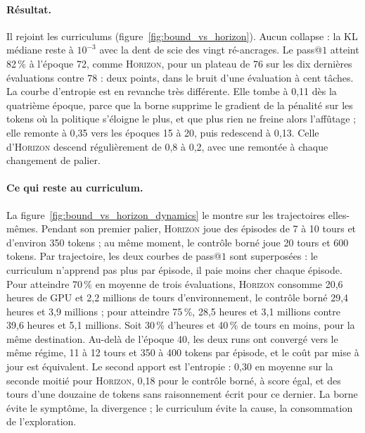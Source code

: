 \documentclass[11pt,a4paper]{article}
\begin{document}
\paragraph{Résultat.} Il rejoint les curriculums (figure~\ref{fig:bound_vs_horizon}). Aucun collapse : la KL médiane reste à $10^{-3}$ avec la dent de scie des vingt ré-ancrages. Le pass@$1$ atteint 82\,\% à l'époque 72, comme \textsc{Horizon}, pour un plateau de 76 sur les dix dernières évaluations contre 78 : deux points, dans le bruit d'une évaluation à cent tâches. La courbe d'entropie est en revanche très différente. Elle tombe à 0{,}11 dès la quatrième époque, parce que la borne supprime le gradient de la pénalité sur les tokens où la politique s'éloigne le plus, et que plus rien ne freine alors l'affûtage ; elle remonte à 0{,}35 vers les époques 15 à 20, puis redescend à 0{,}13. Celle d'\textsc{Horizon} descend régulièrement de 0{,}8 à 0{,}2, avec une remontée à chaque changement de palier.

\paragraph{Ce qui reste au curriculum.} La figure~\ref{fig:bound_vs_horizon_dynamics} le montre sur les trajectoires elles-mêmes. Pendant son premier palier, \textsc{Horizon} joue des épisodes de 7 à 10 tours et d'environ 350 tokens ; au même moment, le contrôle borné joue 20 tours et 600 tokens. Par trajectoire, les deux courbes de pass@$1$ sont superposées : le curriculum n'apprend pas plus par épisode, il paie moins cher chaque épisode. Pour atteindre 70\,\% en moyenne de trois évaluations, \textsc{Horizon} consomme 20{,}6 heures de GPU et 2{,}2 millions de tours d'environnement, le contrôle borné 29{,}4 heures et 3{,}9 millions ; pour atteindre 75\,\%, 28{,}5 heures et 3{,}1 millions contre 39{,}6 heures et 5{,}1 millions. Soit 30\,\% d'heures et 40\,\% de tours en moins, pour la même destination. Au-delà de l'époque 40, les deux runs ont convergé vers le même régime, 11 à 12 tours et 350 à 400 tokens par épisode, et le coût par mise à jour est équivalent. Le second apport est l'entropie : 0{,}30 en moyenne sur la seconde moitié pour \textsc{Horizon}, 0{,}18 pour le contrôle borné, à score égal, et des tours d'une douzaine de tokens sans raisonnement écrit pour ce dernier. La borne évite le symptôme, la divergence ; le curriculum évite la cause, la consommation de l'exploration.
\end{document}
